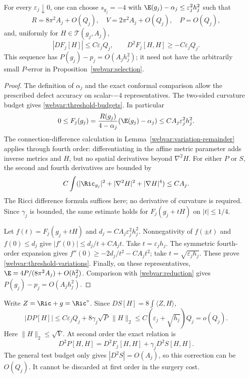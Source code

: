 \begin{proposition}\label{webvar:threshold-selection}
For every $\varepsilon_j\downarrow0$, one can choose $s_{g_j}=-4$
with $\E(g_j)-\alpha_j\le\varepsilon_j^2h_j^2$ such that
\begin{equation}\label{webvar:threshold-budgets}
 R=8\pi^2A_j+O(Q_j),\quad V=2\pi^2A_j+O(Q_j),\quad P=O(Q_j),
\end{equation}
and, uniformly for $H\in\mathcal T(g_j,A_j)$,
\begin{equation}\label{webvar:threshold-variations}
 |DF_j[H]|\le C\varepsilon_jQ_j,\qquad
 D^2F_j[H,H]\ge-C\varepsilon_jQ_j.
\end{equation}
This sequence has $P(g_j)-p_j=O(A_jh_j^2)$; it need not have the
arbitrarily small $P$-error in Proposition~\ref{webvar:selection}.
\end{proposition}
\begin{proof}
The definition of $\alpha_j$ and the exact conformal comparison allow
the prescribed defect accuracy on scalar-$-4$ representatives.
The two-sided curvature budget gives
\eqref{webvar:threshold-budgets}.  In particular
\[
 0\le F_j(g_j)
 =\frac{R(g_j)}{4-\alpha_j}(\E(g_j)-\alpha_j)
 \le C A_j\varepsilon_j^2h_j^2.
\]
The connection-difference calculation in
Lemma~\ref{webvar:variation-remainder} applies through fourth order:
differentiating in the affine metric parameter adds inverse metrics
and $H$, but no spatial derivatives beyond $\nabla^2H$.
For either $P$ or $S$, the second and fourth derivatives are bounded
by
\[
 C\int(|\Ric_{g_j}|^2+|\nabla^2H|^2+|\nabla H|^4)\le C A_j.
\]
The Ricci difference formula suffices here; no derivative of curvature
is required.  Since $\gamma_j$ is bounded, the same estimate holds
for $F_j(g_j+tH)$ on $|t|\le1/4$.

Let $f(t)=F_j(g_j+tH)$ and $d_j=C A_j\varepsilon_j^2h_j^2$.
Nonnegativity of $f(\pm t)$ and $f(0)\le d_j$ give
$|f'(0)|\le d_j/t+C A_jt$.  Take $t=\varepsilon_jh_j$.
The symmetric fourth-order expansion gives
$f''(0)\ge-2d_j/t^2-C A_jt^2$; take
$t=\sqrt{\varepsilon_jh_j}$.  These prove
\eqref{webvar:threshold-variations}.  Finally, on these representatives,
$\E=4P/(8\pi^2A_j)+O(h_j^2)$.
Comparison with \eqref{webvar:reduction} gives
$P(g_j)-p_j=O(A_jh_j^2)$.
\end{proof}

Write $Z=\Ric+g=\Ric^\circ$.  Since $DS[H]=8\int\langle Z,H\rangle$,
\begin{equation}\label{webvar:threshold-first-correction}
 |DP[H]|\le C\varepsilon_jQ_j+
       8\gamma_j\sqrt P\,\|H\|_2
       \le C(\varepsilon_j+\sqrt{h_j})Q_j=o(Q_j).
\end{equation}
Here $\|H\|_2\le\sqrt V$.  At second order the exact relation is
\begin{equation}\label{webvar:threshold-second-correction}
 D^2P[H,H]=D^2F_j[H,H]+\gamma_jD^2S[H,H].
\end{equation}
The general test budget only gives $|D^2S|=O(A_j)$, so this
correction can be $O(Q_j)$.  It cannot be discarded at first order
in the surgery cost.

